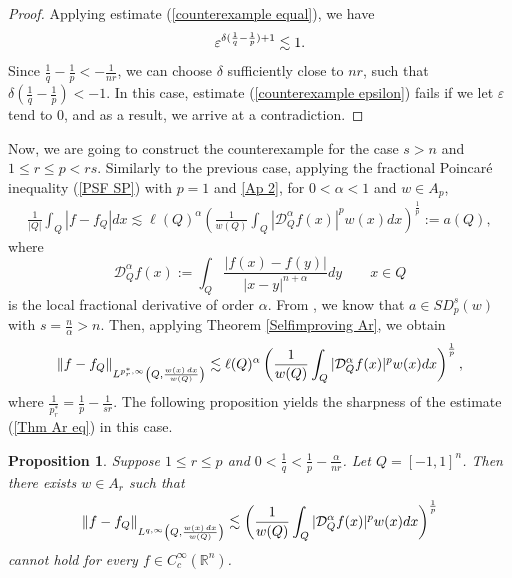 \documentclass[reqno, 10pt, oneside]{amsart}
\numberwithin{equation}{section}
\newcommand{\strt}[1]{\rule{0pt}{#1}}
\renewcommand{\epsilon}{\varepsilon}
\newtheorem{proposition}[theorem]{Proposition}
\numberwithin{theorem}{section}
\renewcommand{\epsilon}{\varepsilon}
\newcommand{\R}{{\mathbb R}}
\newcommand{\norm}[1]{\left\|#1\right\|}
\newcommand{\1}{{\rm 1\hspace*{-0.4ex}%
\rule{0.1ex}{1.52ex}\hspace*{0.2ex}}}
\begin{document}
\begin{proof}
Applying estimate ({\ref{counterexample equal}}), we have
\begin{equation}{\label{counterexample epsilon}}
\epsilon^{\delta(\frac{1}{q}-\frac{1}{p})+1} \lesssim 1.    
\end{equation}
Since $\frac{1}{q}-\frac{1}{p} < -\frac{1}{nr}$, we can  choose $\delta$ sufficiently close to $nr$, such that $\delta(\frac{1}{q} - \frac{1}{p}) < -1$. In this case, estimate (\ref{counterexample epsilon}) fails if we let $\epsilon$ tend to $0$, and as a result, we arrive at a contradiction.
\end{proof}






Now, we are going to construct the counterexample for the case $s > n$ and $1\le r \le p < rs$. Similarly to the previous case, applying the fractional Poincaré inequality (\ref{PSF SP}) with $p=1$ and \eqref{Ap 2}, for $0 < \alpha <1$  and $w \in A_p$,
\begin{align*}
\frac{1}{|Q|}\int_Q |f-f_Q| dx \lesssim  \ell(Q)^{\alpha}\left(\frac{1}{w(Q)}\int_{Q}|\mathcal D_Q^{\alpha} f(x)|^p w(x) dx\right)^{\frac{1}{p}}:=a(Q),
\end{align*}
where 
%
$$\mathcal{D}_Q^{\alpha}f(x):=\int_{Q}\frac{|f(x)-f(y)|}{|x-y|^{n+\alpha}} dy\qquad x\in Q
$$
%
is the local fractional derivative of order $\alpha$. From \cite[Lemma 3.2]{PR}, we know that $a \in SD_p^{s}(w)$ with $s=\frac{n}{\alpha}>n$. Then, applying Theorem {\ref{Selfimproving Ar}}, we obtain
\begin{equation*}
	\norm{f-f_Q}_{\strt{2.3ex} L^{p_r^{*},\infty}\left(Q, \frac{w(x)\, dx}{w(Q)}\right)} \lesssim \ell(Q)^{\alpha}\left(\frac{1}{w(Q)}\int_{Q}|\mathcal D_Q^{\alpha} f(x)|^p w(x) dx\right)^{\frac{1}{p}},
\end{equation*}
where $\frac{1}{p_r^{*}} = \frac{1}{p} - \frac{1}{sr}$. The following proposition yields the sharpness of the estimate (\ref{Thm Ar eq}) in this case.


\begin{proposition}\label{prop: counterexample fractional p=1} 
Suppose $1\le r\le p$ and $0 < \frac{1}{q}<\frac{1}{p}-\frac{\alpha}{nr}$. Let $Q=[-1,1]^n$. Then there exists $w \in A_r$ such that 
\begin{equation*}
\norm{f-f_Q}_{\strt{2.3ex} L^{q,\infty}\left(Q, \frac{w(x)\, dx}{w(Q)}\right)} \lesssim \left(\frac{1}{w(Q)}\int_{Q}|\mathcal D_Q^{\alpha} f(x)|^p w(x) dx\right)^{\frac{1}{p}}   
\end{equation*}
cannot hold for every $f \in C_c^{\infty}(\R^n)$.
\end{proposition}
\end{document}
